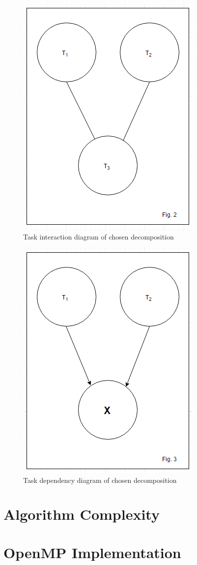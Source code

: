 \documentclass[11pt]{article}
\begin{document}
\begin{page}
\begin{figure}[ht]
\centering
     \includegraphics[scale=0.75]{parallel_fig2}\\
     Task interaction diagram of chosen decomposition
\end{figure}

\begin{figure}[ht]
\centering
     \includegraphics[scale=0.75]{parallel_fig3}\\
     Task dependency diagram of chosen decomposition
\end{figure}

\section{Algorithm Complexity}

\section{OpenMP Implementation}

\end{page}
\end{document}
